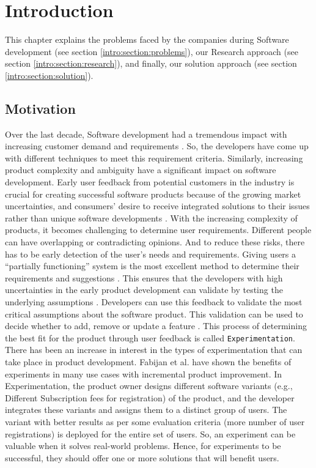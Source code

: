 \chapter{Introduction} \label{chap:intro}
This chapter explains the problems faced by the companies during Software development (see section \ref{intro:section:problems}), our Research approach (see section \ref{intro:section:research}), and finally, our solution approach (see section \ref{intro:section:solution}).

\section{Motivation}
Over the last decade, Software development had a tremendous impact with increasing customer demand and requirements \cite{article:swdemand:ahmed}. 
So, the developers have come up with different techniques to meet this requirement criteria. 
Similarly, increasing product complexity and ambiguity have a significant impact on software development. 
Early user feedback from potential customers in the industry is crucial for creating successful software products because of the growing market uncertainties, and consumers' desire to receive integrated solutions to their issues rather than unique software developments \cite{misc:businessmodels:teece}.
With the increasing complexity of products, it becomes challenging to determine user requirements.
Different people can have overlapping or contradicting opinions. 
And to reduce these risks, there has to be early detection of the user's needs and requirements. 
Giving users a ``partially functioning'' system is the most excellent method to determine their requirements and suggestions \cite{journal:prototyping:davis}.
This ensures that the developers with high uncertainties in the early product development can validate by testing the underlying assumptions \cite{misc:lean:steve}.
Developers can use this feedback to validate the most critical assumptions about the software product. 
This validation can be used to decide whether to add, remove or update a feature \cite{article:experiments:lindgren}. 
This process of determining the best fit for the product through user feedback is called \texttt{Experimentation}.
There has been an increase in interest in the types of experimentation that can take place in product development. 
Fabijan et al. \cite{article:controlled:experiements} have shown the benefits of experiments in many use cases with incremental product improvement. 
In Experimentation, the product owner designs different software variants (e.g., Different Subscription fees for registration) of the product, and the developer integrates these variants and assigns them to a distinct group of users. The variant with better results as per some evaluation criteria (more number of user registrations) is deployed for the entire set of users.
So, an experiment can be valuable when it solves real-world problems.
Hence, for experiments to be successful, they should offer one or more solutions that will benefit users.

